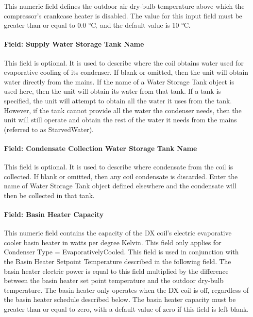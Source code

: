 This numeric field defines the outdoor air dry-bulb temperature above which the compressor's crankcase heater is disabled. The value for this input field must be greater than or equal to 0.0 °C, and the default value is 10 °C.

\paragraph{Field: Supply Water Storage Tank Name}\label{field-supply-water-storage-tank-name-000}

This field is optional. It is used to describe where the coil obtains water used for evaporative cooling of its condenser. If blank or omitted, then the unit will obtain water directly from the mains. If the name of a Water Storage Tank object is used here, then the unit will obtain its water from that tank. If a tank is specified, the unit will attempt to obtain all the water it uses from the tank. However, if the tank cannot provide all the water the condenser needs, then the unit will still operate and obtain the rest of the water it needs from the mains (referred to as StarvedWater).

\paragraph{Field: Condensate Collection Water Storage Tank Name}\label{field-condensate-collection-water-storage-tank-name-2}

This field is optional. It is used to describe where condensate from the coil is collected. If blank or omitted, then any coil condensate is discarded. Enter the name of Water Storage Tank object defined elsewhere and the condensate will then be collected in that tank.

\paragraph{Field: Basin Heater Capacity}\label{field-basin-heater-capacity-000}

This numeric field contains the capacity of the DX coil's electric evaporative cooler basin heater in watts per degree Kelvin. This field only applies for Condenser Type = EvaporativelyCooled. This field is used in conjunction with the Basin Heater Setpoint Temperature described in the following field. The basin heater electric power is equal to this field multiplied by the difference between the basin heater set point temperature and the outdoor dry-bulb temperature. The basin heater only operates when the DX coil is off, regardless of the basin heater schedule described below. The basin heater capacity must be greater than or equal to zero, with a default value of zero if this field is left blank.


